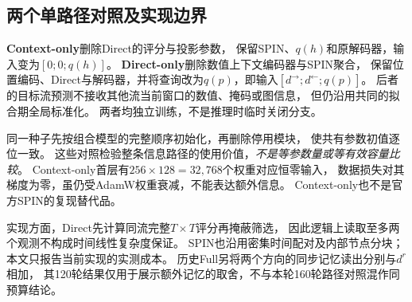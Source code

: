 \subsection{两个单路径对照及实现边界}
\textbf{Context-only}删除Direct的评分与投影参数，
保留SPIN、$q(h)$和原解码器，输入变为$[0;0;q(h)]$。
\textbf{Direct-only}删除数值上下文编码器与SPIN聚合，
保留位置编码、Direct与解码器，并将查询改为$q(p)$，即输入$[d^{\rightarrow};d^{\leftarrow};q(p)]$。
后者的目标流预测不接收其他流当前窗口的数值、掩码或图信息，
但仍沿用共同的拟合期全局标准化。
两者均独立训练，不是推理时临时关闭分支。

同一种子先按组合模型的完整顺序初始化，再删除停用模块，
使共有参数初值逐位一致。
这些对照检验整条信息路径的使用价值，\emph{不是等参数量或等有效容量比较}。
Context-only首层有$256\times128=32{,}768$个权重对应恒零输入，
数据损失对其梯度为零，虽仍受AdamW权重衰减，不能表达额外信息。
Context-only也不是官方SPIN的复现替代品。

实现方面，Direct先计算同流完整$T\times T$评分再掩蔽筛选，
因此逻辑上读取至多两个观测不构成时间线性复杂度保证。
SPIN也沿用密集时间配对及内部节点分块；本文只报告当前实现的实测成本。
历史Full另将两个方向的同步记忆读出分别与$d^r$相加，
其120轮结果仅用于展示额外记忆的取舍，不与本轮160轮路径对照混作同预算结论。

